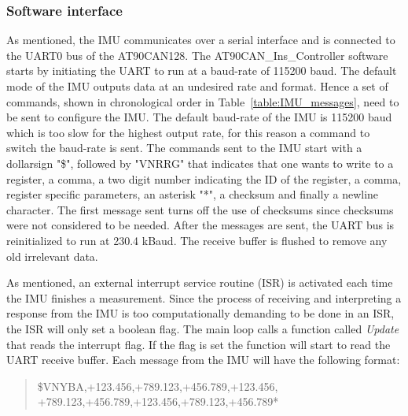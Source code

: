 \subsubsection{Software interface}
As mentioned, the IMU communicates over a serial interface and is connected to the UART0 bus of the AT90CAN128. The AT90CAN\_Ins\_Controller software starts by initiating the UART to run at a baud-rate of 115200 baud. \newline
The default mode of the IMU outputs data at an undesired rate and format. Hence a set of commands, shown in chronological order in Table~\ref{table:IMU_messages}, need to be sent to configure the IMU. The default baud-rate of the IMU is 115200 baud which is too slow for the highest output rate, for this reason a command to switch the baud-rate is sent. \newline
The commands sent to the IMU start with a dollarsign "\$", followed by "VNRRG" that indicates that one wants to write to a register, a comma, a two digit number indicating the ID of the register, a comma, register specific parameters, an asterisk "*", a checksum and finally a newline character. 
The first message sent turns off the use of checksums since checksums were not considered to be needed. \newline
After the messages are sent, the UART bus is reinitialized to run at 230.4 kBaud. The receive buffer is flushed to remove any old irrelevant data.

As mentioned, an external interrupt service routine (ISR) is activated each time the IMU finishes a measurement. Since the process of receiving and interpreting a response from the IMU is too computationally demanding to be done in an ISR, the ISR will only set a boolean flag. \newline
The main loop calls a function called \emph{Update} that reads the interrupt flag. If the flag is set the function will start to read the UART receive buffer. Each message from the IMU will have the following format: 

\begin{quote}
   \$VNYBA,+123.456,+789.123,+456.789,+123.456, \newline
   +789.123,+456.789,+123.456,+789.123,+456.789*
\end{quote}


